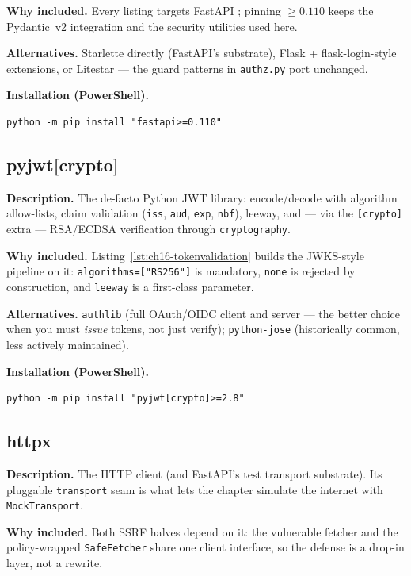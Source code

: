 \textbf{Why included.} Every listing targets FastAPI
\cite{fastapidocs}; pinning $\ge 0.110$ keeps the Pydantic~v2 integration
and the security utilities used here.

\textbf{Alternatives.} Starlette directly (FastAPI's substrate), Flask +
flask-login-style extensions, or Litestar --- the guard patterns in
\texttt{authz.py} port unchanged.

\textbf{Installation (PowerShell).}
\begin{verbatim}
python -m pip install "fastapi>=0.110"
\end{verbatim}

\subsection{pyjwt[crypto]}

\textbf{Description.} The de-facto Python JWT library: encode/decode with
algorithm allow-lists, claim validation (\texttt{iss}, \texttt{aud},
\texttt{exp}, \texttt{nbf}), leeway, and --- via the \texttt{[crypto]}
extra --- RSA/ECDSA verification through \texttt{cryptography}.

\textbf{Why included.} Listing~\ref{lst:ch16-tokenvalidation} builds the
JWKS-style pipeline on it: \texttt{algorithms=["RS256"]} is mandatory,
\texttt{none} is rejected by construction, and \texttt{leeway} is a
first-class parameter.

\textbf{Alternatives.} \texttt{authlib} (full OAuth/OIDC client and server
--- the better choice when you must \emph{issue} tokens, not just verify);
\texttt{python-jose} (historically common, less actively maintained).

\textbf{Installation (PowerShell).}
\begin{verbatim}
python -m pip install "pyjwt[crypto]>=2.8"
\end{verbatim}

\subsection{httpx}

\textbf{Description.} The HTTP client (and FastAPI's test transport
substrate). Its pluggable \texttt{transport} seam is what lets the chapter
simulate the internet with \texttt{MockTransport}.

\textbf{Why included.} Both SSRF halves depend on it: the vulnerable
fetcher and the policy-wrapped \texttt{SafeFetcher} share one client
interface, so the defense is a drop-in layer, not a rewrite.

